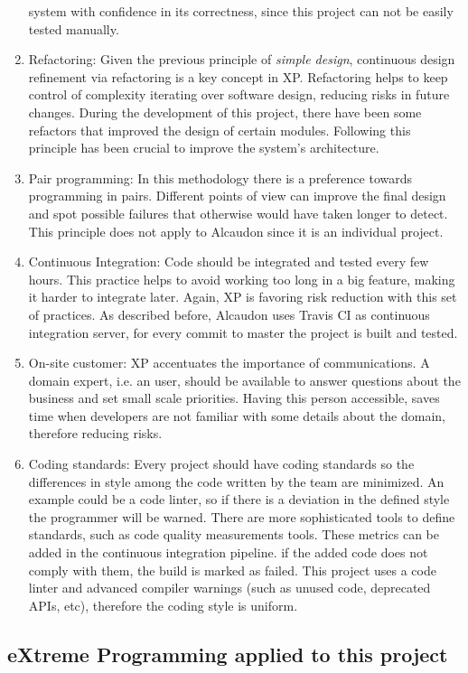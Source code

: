 \begin{enumerate}
  system with confidence in its correctness, since this project can not be
  easily tested manually.
\item Refactoring: Given the previous principle of \textit{simple design},
  continuous design refinement via refactoring is a key concept in XP.
  Refactoring helps to keep control of complexity iterating over software
  design, reducing risks in future changes. During the development of this
  project, there have been some refactors that improved the design of certain
  modules. Following this principle has been crucial to improve the system's
  architecture.
\item Pair programming: In this methodology there is a preference towards programming
  in pairs. Different points of view can improve the final design and spot
  possible failures that otherwise would have taken longer to detect. This
  principle does not apply to Alcaudon since it is an individual project.
\item Continuous Integration: Code should be integrated and tested every few
  hours. This practice helps to avoid working too long in a big feature, making
  it harder to integrate later. Again, XP is favoring risk reduction with this
  set of practices. As described before, Alcaudon uses Travis CI as continuous
  integration server, for every commit to master the project is built and
  tested.
\item On-site customer: XP accentuates the importance of communications. A
  domain expert, i.e. an user, should be available to answer questions about the
  business and set small scale priorities. Having this person accessible, saves
  time when developers are not familiar with some details about the domain, therefore
  reducing risks.
\item Coding standards: Every project should have coding standards so the
  differences in style among the code written by the team are minimized. An
  example could be a code linter, so if there is a deviation in the defined
  style the programmer will be warned. There are more sophisticated tools to
  define standards, such as code quality measurements tools. These metrics can
  be added in the continuous integration pipeline. if the added code does not
  comply with them, the build is marked as failed. This project uses a code
  linter and advanced compiler warnings (such as unused code, deprecated APIs,
  etc), therefore the coding style is uniform.
\end{enumerate}

\subsection{eXtreme Programming applied to this project}

